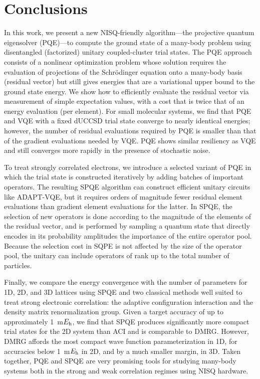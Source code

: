 \documentclass[aps,prx, reprint]{revtex4-2}
\newcommand*{\Eh}{$E_{\rm h}$\xspace}
\begin{document}
\section{Conclusions}
\label{sec:conclusions}

In this work, we present a new NISQ-friendly algorithm---the projective quantum eigensolver (PQE)---to compute the ground state of a many-body problem using disentangled (factorized) unitary coupled-cluster trial states.
The PQE approach consists of a nonlinear optimization problem whose solution requires the evaluation of projections of the Schr\"{o}dinger equation onto a many-body basis (residual vector) but still gives energies that are a variational upper bound to the ground state energy.
We show how to efficiently evaluate the residual vector via measurement of simple expectation values, with a cost that is twice that of an energy evaluation (per element).
For small molecular systems, we find that PQE and VQE with a fixed dUCCSD  trial state converge to nearly identical energies; however, the number of residual evaluations required by PQE is smaller than that of the gradient evaluations needed by VQE.
PQE shows similar resiliency as VQE and still converges more rapidly in the presence of stochastic noise.

To treat strongly correlated electrons, we introduce a selected variant of PQE in which the trial state is constructed iteratively by adding batches of important operators.
The resulting SPQE algorithm can construct efficient unitary circuits like ADAPT-VQE, but it requires orders of magnitude fewer residual element evaluations than gradient element evaluations for the latter.
In SPQE, the selection of new operators is done according to the magnitude of the elements of the residual vector, and is performed by sampling a quantum state that directly encodes in its probability amplitudes the importance of the entire operator pool.
Because the selection cost in SQPE is not affected by the size of the operator pool, the unitary can include operators of rank up to the total number of particles.

Finally, we compare the energy convergence with the number of parameters for 1D, 2D, and 3D  lattices using SPQE and two classical methods well suited to treat strong electronic correlation: the adaptive configuration interaction  and the density matrix renormalization group.
Given a target accuracy of up to approximately 1~m\Eh, we find that SPQE produces significantly more compact trial states for the 2D system than ACI and is comparable to DMRG.
However, DMRG affords the most compact wave function parameterization in 1D, for accuracies below 1~m\Eh in 2D, and by a much smaller margin, in 3D.
Taken together, PQE and SPQE are very promising tools for studying many-body systems both in the strong and weak correlation regimes using NISQ hardware.
\end{document}
